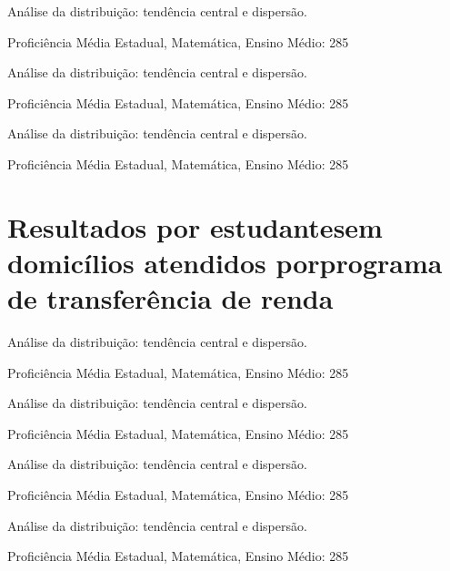 \documentclass[
  ignorenonframetext,
]{beamer}
\begin{document}
\begin{frame}
Análise da distribuição: tendência central e dispersão.

Proficiência Média Estadual, Matemática, Ensino Médio: 285
\end{frame}

\begin{frame}
Análise da distribuição: tendência central e dispersão.

Proficiência Média Estadual, Matemática, Ensino Médio: 285
\end{frame}

\begin{frame}
Análise da distribuição: tendência central e dispersão.

Proficiência Média Estadual, Matemática, Ensino Médio: 285
\end{frame}

\hypertarget{resultados-por-estudantes-em-domicuxedlios-atendidos-por-programa-de-transferuxeancia-de-renda-1}{%
\section{\texorpdfstring{Resultados por estudantesem domicílios
atendidos porprograma de transferência de
renda}{Resultados por estudantes em domicílios atendidos por programa de transferência de renda}}\label{resultados-por-estudantes-em-domicuxedlios-atendidos-por-programa-de-transferuxeancia-de-renda-1}}

\begin{frame}
Análise da distribuição: tendência central e dispersão.

Proficiência Média Estadual, Matemática, Ensino Médio: 285
\end{frame}

\begin{frame}
Análise da distribuição: tendência central e dispersão.

Proficiência Média Estadual, Matemática, Ensino Médio: 285
\end{frame}

\begin{frame}
Análise da distribuição: tendência central e dispersão.

Proficiência Média Estadual, Matemática, Ensino Médio: 285
\end{frame}

\begin{frame}
Análise da distribuição: tendência central e dispersão.

Proficiência Média Estadual, Matemática, Ensino Médio: 285
\end{frame}
\end{document}

